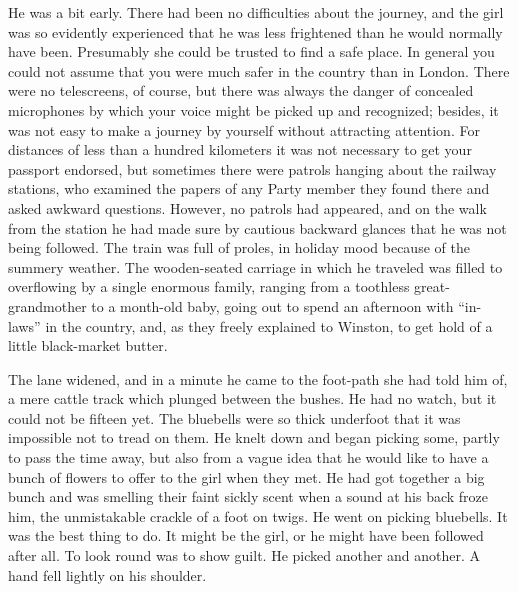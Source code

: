 He was a bit early. There had been no difficulties about the journey,
and the girl was so evidently experienced that he was less frightened
than he would normally have been. Presumably she could be trusted to
find a safe place. In general you could not assume that you were much
safer in the country than in London. There were no telescreens, of
course, but there was always the danger of concealed microphones by
which your voice might be picked up and recognized; besides, it was not
easy to make a journey by yourself without attracting attention. For
distances of less than a hundred kilometers it was not necessary to get
your passport endorsed, but sometimes there were patrols hanging about
the railway stations, who examined the papers of any Party member they
found there and asked awkward questions. However, no patrols had
appeared, and on the walk from the station he had made sure by cautious
backward glances that he was not being followed. The train was full of
proles, in holiday mood because of the summery weather. The
wooden-seated carriage in which he traveled was filled to overflowing by
a single enormous family, ranging from a toothless great-grandmother to
a month-old baby, going out to spend an afternoon with ``in-laws'' in the
country, and, as they freely explained to Winston, to get hold of a
little black-market butter.

The lane widened, and in a minute he came to the foot-path she had told
him of, a mere cattle track which plunged between the bushes. He had no
watch, but it could not be fifteen yet. The bluebells were so thick
underfoot that it was impossible not to tread on them. He knelt down and
began picking some, partly to pass the time away, but also from a vague
idea that he would like to have a bunch of flowers to offer to the girl
when they met. He had got together a big bunch and was smelling their
faint sickly scent when a sound at his back froze him, the unmistakable
crackle of a foot on twigs. He went on picking bluebells. It was the
best thing to do. It might be the girl, or he might have been followed
after all. To look round was to show guilt. He picked another and
another. A hand fell lightly on his shoulder.

